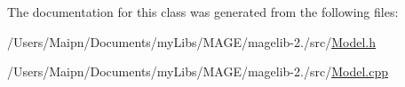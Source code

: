 The documentation for this class was generated from the following files\-:\begin{DoxyCompactItemize}
\item 
/\-Users/\-Maipn/\-Documents/my\-Libs/\-M\-A\-G\-E/magelib-\/2./src/\hyperlink{_model_8h}{Model.\-h}\item 
/\-Users/\-Maipn/\-Documents/my\-Libs/\-M\-A\-G\-E/magelib-\/2./src/\hyperlink{_model_8cpp}{Model.\-cpp}\end{DoxyCompactItemize}
